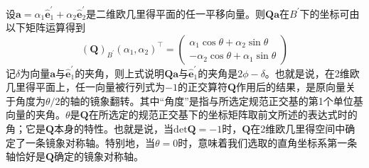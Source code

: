 \documentclass[main.tex]{subfiles}
\begin{document}
设$\mathbf{a}=\alpha_1\mathbf{\hat{e}}^\prime_1+\alpha_2\mathbf{\hat{e}}^\prime_2$是二维欧几里得平面的任一平移向量。则$\mathbf{Qa}$在$B^\prime$下的坐标可由以下矩阵运算得到
\[\left(\mathbf{Q}\right)_{B^\prime}\left(\alpha_1,\alpha_2\right)^\intercal=\left(\begin{array}{c}\alpha_1\cos\theta+\alpha_2\sin\theta\\-\alpha_2\cos\theta+\alpha_1\sin\theta\end{array}\right)\]
记$\delta$为向量$\mathbf{a}$与$\mathbf{\hat{e}}^\prime_1$的夹角，则上式说明$\mathbf{Qa}$与$\mathbf{\hat{e}}^\prime_1$的夹角是$2\phi-\delta$。也就是说，在2维欧几里得平面上，任一向量被行列式为$-1$的正交算符$\mathbf{Q}$作用后的结果，是原向量关于角度为$\theta/2$的轴的镜象翻转。其中“角度”是指与所选定规范正交基的第1个单位基向量的夹角。$\theta$是$\mathbf{Q}$在所选定的规范正交基下的坐标矩阵取前文所述的表达式时的角；它是$\mathbf{Q}$本身的特性。也就是说，当$\mathrm{det}\mathbf{Q}=-1$时，$\mathbf{Q}$在2维欧几里得空间中确定了一条镜象对称轴。特别地，当$\theta=0$时，意味着我们选取的直角坐标系第一条轴恰好是$\mathbf{Q}$确定的镜象对称轴。
\end{document}
